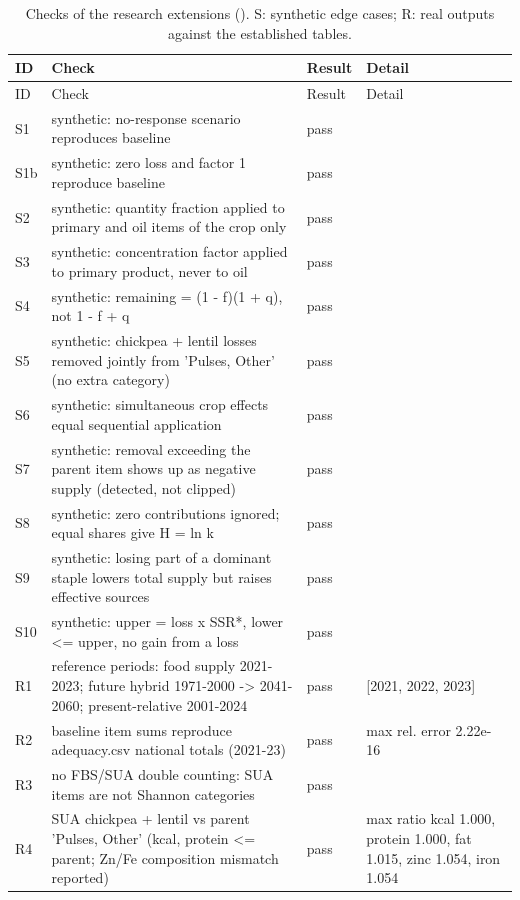 \begin{longtable}{@{}lp{9.0cm}lp{3.8cm}@{}}
\caption{Checks of the research extensions (). S: synthetic edge cases; R: real outputs against the established tables.}\label{tab:extchecks}\\
\toprule
ID & Check & Result & Detail \\
\midrule
\endfirsthead
\toprule
ID & Check & Result & Detail \\
\midrule
\endhead
\bottomrule
\endfoot
S1 & synthetic: no-response scenario reproduces baseline & pass &  \\
S1b & synthetic: zero loss and factor 1 reproduce baseline & pass &  \\
S2 & synthetic: quantity fraction applied to primary and oil items of the crop only & pass &  \\
S3 & synthetic: concentration factor applied to primary product, never to oil & pass &  \\
S4 & synthetic: remaining = (1 - f)(1 + q), not 1 - f + q & pass &  \\
S5 & synthetic: chickpea + lentil losses removed jointly from 'Pulses, Other' (no extra category) & pass &  \\
S6 & synthetic: simultaneous crop effects equal sequential application & pass &  \\
S7 & synthetic: removal exceeding the parent item shows up as negative supply (detected, not clipped) & pass &  \\
S8 & synthetic: zero contributions ignored; equal shares give H = ln k & pass &  \\
S9 & synthetic: losing part of a dominant staple lowers total supply but raises effective sources & pass &  \\
S10 & synthetic: upper = loss x SSR*, lower <= upper, no gain from a loss & pass &  \\
R1 & reference periods: food supply 2021-2023; future hybrid 1971-2000 -> 2041-2060; present-relative 2001-2024 & pass & [2021, 2022, 2023] \\
R2 & baseline item sums reproduce adequacy.csv national totals (2021-23) & pass & max rel. error 2.22e-16 \\
R3 & no FBS/SUA double counting: SUA items are not Shannon categories & pass &  \\
R4 & SUA chickpea + lentil vs parent 'Pulses, Other' (kcal, protein <= parent; Zn/Fe composition mismatch reported) & pass & max ratio kcal 1.000, protein 1.000, fat 1.015, zinc 1.054, iron 1.054 \\

\end{longtable}
